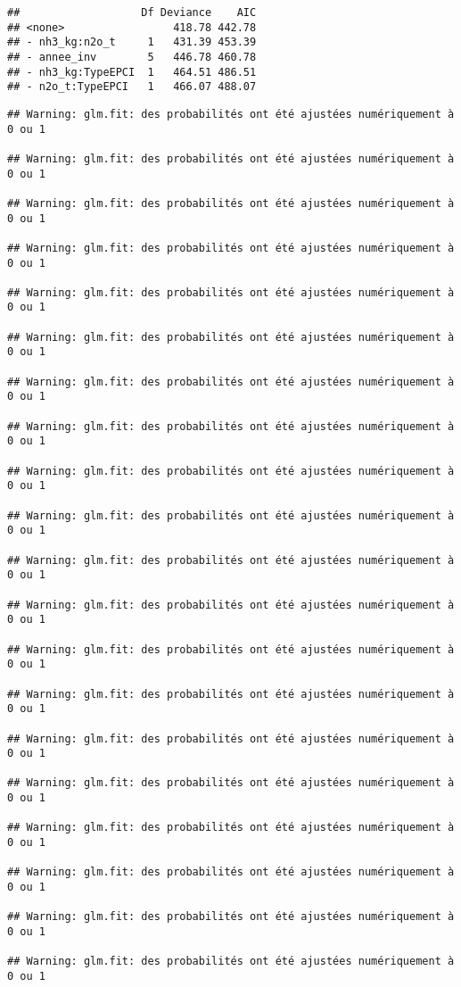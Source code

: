 \documentclass[
]{article}
\begin{document}
\begin{verbatim}
##                   Df Deviance    AIC
## <none>                 418.78 442.78
## - nh3_kg:n2o_t     1   431.39 453.39
## - annee_inv        5   446.78 460.78
## - nh3_kg:TypeEPCI  1   464.51 486.51
## - n2o_t:TypeEPCI   1   466.07 488.07
\end{verbatim}

\begin{verbatim}
## Warning: glm.fit: des probabilités ont été ajustées numériquement à 0 ou 1

## Warning: glm.fit: des probabilités ont été ajustées numériquement à 0 ou 1

## Warning: glm.fit: des probabilités ont été ajustées numériquement à 0 ou 1

## Warning: glm.fit: des probabilités ont été ajustées numériquement à 0 ou 1

## Warning: glm.fit: des probabilités ont été ajustées numériquement à 0 ou 1

## Warning: glm.fit: des probabilités ont été ajustées numériquement à 0 ou 1

## Warning: glm.fit: des probabilités ont été ajustées numériquement à 0 ou 1

## Warning: glm.fit: des probabilités ont été ajustées numériquement à 0 ou 1

## Warning: glm.fit: des probabilités ont été ajustées numériquement à 0 ou 1

## Warning: glm.fit: des probabilités ont été ajustées numériquement à 0 ou 1

## Warning: glm.fit: des probabilités ont été ajustées numériquement à 0 ou 1

## Warning: glm.fit: des probabilités ont été ajustées numériquement à 0 ou 1

## Warning: glm.fit: des probabilités ont été ajustées numériquement à 0 ou 1

## Warning: glm.fit: des probabilités ont été ajustées numériquement à 0 ou 1

## Warning: glm.fit: des probabilités ont été ajustées numériquement à 0 ou 1

## Warning: glm.fit: des probabilités ont été ajustées numériquement à 0 ou 1

## Warning: glm.fit: des probabilités ont été ajustées numériquement à 0 ou 1

## Warning: glm.fit: des probabilités ont été ajustées numériquement à 0 ou 1

## Warning: glm.fit: des probabilités ont été ajustées numériquement à 0 ou 1

## Warning: glm.fit: des probabilités ont été ajustées numériquement à 0 ou 1
\end{verbatim}
\end{document}
